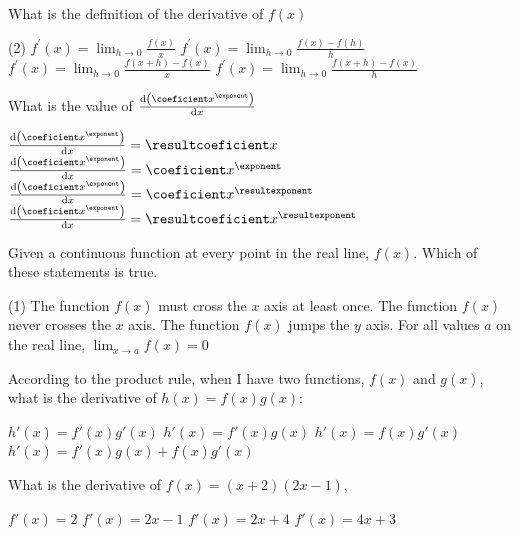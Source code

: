 \documentclass[12pt, noquestionbreak, flushbottom, customfontpath=../Fonts/]{../skrexam}  %
\begin{document}
\begin{questions}

\question What is the definition of the derivative of $f(x)$
 	\begin{choices}(2)
	\choice $\displaystyle f^\prime(x) = \lim_{h \to 0} \frac{f(x)}{x}$
	\choice $\displaystyle f^\prime(x) = \lim_{h \to 0} \frac{f(x) - f(h)}{h}$
	\choice $\displaystyle f^\prime(x) = \lim_{h \to 0} \frac{f(x+h)-f(x)}{x}$	
 	\choice\CorrectChoice $\displaystyle f^\prime(x) = \lim_{h \to 0} \frac{f(x+h)-f(x)}{h}$
 	\end{choices}

\question 
	\pgfmathtruncatemacro{\resultcoeficient}{\coeficient*\exponent}
	What is the value of $\dv{\qty(\coeficient x^{\exponent})}{x}$
	\begin{choices}
		\choice $\dv{\qty(\coeficient x^{\exponent})}{x} = \resultcoeficient x$
		\choice $\dv{\qty(\coeficient x^{\exponent})}{x} = \coeficient x^{\exponent}$
		\choice $\dv{\qty(\coeficient x^{\exponent})}{x} = \coeficient x^{\resultexponent}$
		\choice\CorrectChoice $\dv{\qty(\coeficient x^{\exponent})}{x} = \resultcoeficient x^{\resultexponent}$
	\end{choices}

	\question Given a continuous function at every point in the real line, $f(x)$. Which of these statements is true. 
	\begin{choices}(1)
		\choice The function $f(x)$ must cross the $x$ axis at least once.
		\choice The function $f(x)$ never crosses the $x$ axis.
		\choice The function $f(x)$ jumps the $y$ axis.
		\choice\CorrectChoice For all values $a$ on the real line, $ \lim_{x \to a}f(x)  = 0$
	\end{choices}
	

	
	\question According to the product rule, when I have two functions, $f(x)$ and $g(x)$, what is the derivative of $h(x) = f(x) g(x)$:
	\begin{choices}
		\choice $h'(x) = f'(x) g '(x)$
		\choice $h'(x) = f'(x) g(x)$
		\choice $h'(x) = f(x) g '(x)$
		\choice\CorrectChoice $h'(x) = f'(x) g(x)+ f(x) g '(x)$
	\end{choices}

	\question What is the derivative of  $f(x) = (x + 2)(2x- 1)$,
	\begin{choices}
		\choice $f'(x) = 2$
		\choice $f'(x) = 2x - 1$
		\choice $f'(x) = 2x + 4$
		\choice\CorrectChoice $f'(x) = 4 x + 3$
	\end{choices}





\end{questions}
\end{document}

